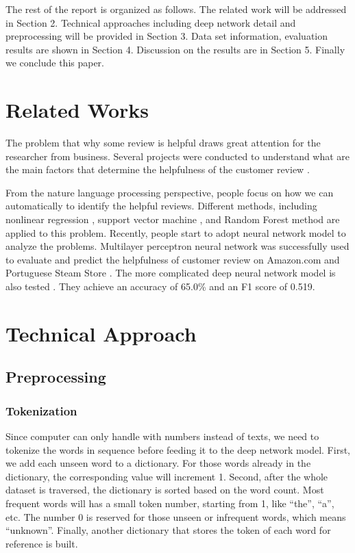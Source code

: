 \documentclass[11pt]{article}
\begin{document}
The rest of the report is organized as follows. The related work will be addressed in Section 2. Technical approaches including deep network detail and preprocessing will be provided in Section 3. Data set information, evaluation results are shown in Section 4. Discussion on the results are in Section 5. Finally we conclude this paper. 

\section{Related Works}

The problem that why some review is helpful draws great attention for the researcher from business. Several projects were conducted to understand what are the main factors that determine the helpfulness of the customer review \cite{mudambi2010amazon,schindler2012peceivedhelpfulness}.

From the nature language processing perspective, people focus on how we can automatically to identify the helpful reviews. Different methods, including nonlinear regression \cite{liu2008nonlinear}, support vector machine \cite{kim2006svm}, and Random Forest method \cite{ghose2011randomforest} are applied to this problem. Recently, people start to adopt neural network model to analyze the problems. Multilayer perceptron neural network was successfully used to evaluate and predict the helpfulness of customer review on Amazon.com and Portuguese Steam Store \cite{mudambi2010amazon,barbosa2016steam}. The more complicated deep neural network model is also tested \cite{nguyevaluate2016lstm}. They achieve an accuracy of 65.0\% and an F1 score of 0.519.

\section{Technical Approach}

\subsection{Preprocessing}

\subsubsection{Tokenization}\label{tech_token}

Since computer can only handle with numbers instead of texts, we need to tokenize the words in sequence before feeding it to the deep network model. First, we add each unseen word to a dictionary. For those words already in the dictionary, the corresponding value will increment 1. Second, after the whole dataset is traversed, the dictionary is sorted based on the word count. Most frequent words will has a small token number, starting from 1, like ``the'', ``a'', etc. The number 0 is reserved for those unseen or infrequent words, which means ``unknown''. Finally, another dictionary that stores the token of each word for reference is built.
\end{document}

